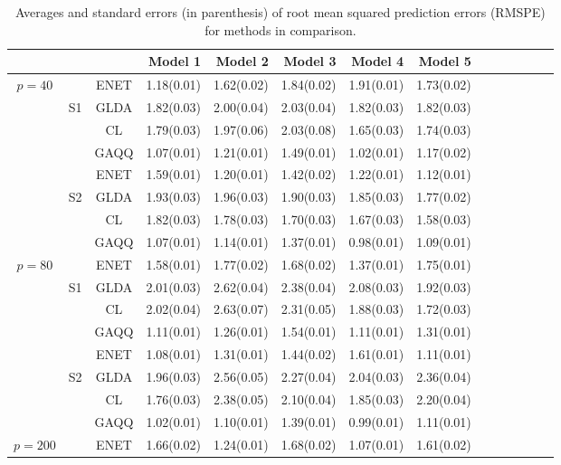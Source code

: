 \documentclass[12pt]{article}
\begin{document}
\begin{table}
\begin{center}
\caption{Averages and standard errors (in parenthesis) of root mean squared prediction errors (RMSPE) for methods in comparison.}
\label{table:rmse}
\begin{tabular}{cccrrrrrrrrrrr}
\hline \hline
\multicolumn{3}{c}{}&Model 1&Model 2&Model 3&Model 4&Model 5\\
\hline
\multirow{8}{*}{$p=40$}
&  &ENET&1.18(0.01) &1.62(0.02) &1.84(0.02) &1.91(0.01) &1.73(0.02) \\
&S1&GLDA&1.82(0.03) &2.00(0.04) &2.03(0.04) &1.82(0.03) &1.82(0.03) \\
&  &CL  &1.79(0.03) &1.97(0.06) &2.03(0.08) &1.65(0.03) &1.74(0.03) \\
&  &GAQQ&1.07(0.01) &1.21(0.01) &1.49(0.01) &1.02(0.01) &1.17(0.02) \\
\hhline{~---------}
&  &ENET&1.59(0.01) &1.20(0.01) &1.42(0.02) &1.22(0.01) &1.12(0.01) \\
&S2&GLDA&1.93(0.03) &1.96(0.03) &1.90(0.03) &1.85(0.03) &1.77(0.02)\\
&  &CL  &1.82(0.03) &1.78(0.03) &1.70(0.03) &1.67(0.03) &1.58(0.03) \\
&  &GAQQ&1.07(0.01) &1.14(0.01) &1.37(0.01) &0.98(0.01) &1.09(0.01) \\
\hline
\multirow{8}{*}{$p=80$}
&  &ENET&1.58(0.01) &1.77(0.02) &1.68(0.02) &1.37(0.01) &1.75(0.01) \\
&S1&GLDA&2.01(0.03) &2.62(0.04) &2.38(0.04) &2.08(0.03) &1.92(0.03) \\
&  &CL  &2.02(0.04) &2.63(0.07) &2.31(0.05) &1.88(0.03) &1.72(0.03) \\
&  &GAQQ&1.11(0.01) &1.26(0.01) &1.54(0.01) &1.11(0.01) &1.31(0.01) \\
\hhline{~---------}
&  &ENET&1.08(0.01) &1.31(0.01) &1.44(0.02) &1.61(0.01) &1.11(0.01) \\
&S2&GLDA&1.96(0.03) &2.56(0.05) &2.27(0.04) &2.04(0.03) &2.36(0.04) \\
&  &CL  &1.76(0.03) &2.38(0.05) &2.10(0.04) &1.85(0.03) &2.20(0.04) \\
&  &GAQQ&1.02(0.01) &1.10(0.01) &1.39(0.01) &0.99(0.01) &1.11(0.01) \\
\hline
\multirow{8}{*}{$p=200$}
&  &ENET&1.66(0.02) &1.24(0.01) &1.68(0.02) &1.07(0.01) &1.61(0.02) \\

\end{tabular}
\end{center}
\end{table}
\end{document}
